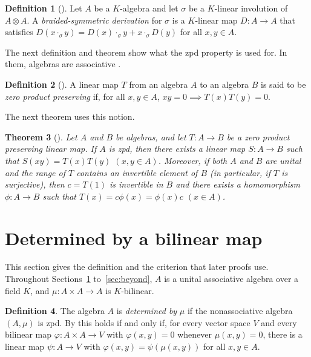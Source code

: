 \documentclass[]{interact}
\theoremstyle{plain}
\newtheorem{theorem}{Theorem}[section]
\theoremstyle{definition}
\newtheorem{definition}[theorem]{Definition}
\theoremstyle{remark}
\begin{document}
\begin{definition}[{\citep[Definition 3.1]{Adrabi2026}}]\label{def:adrabi-bsder}
Let $A$ be a $K$-algebra and let $\sigma$ be a $K$-linear involution of $A \otimes A$.
A \emph{braided-symmetric derivation} for $\sigma$ is a $K$-linear map $D \colon A \to A$ that satisfies $D(x \cdot_\sigma y) = D(x) \cdot_\sigma y + x \cdot_\sigma D(y)$ for all $x, y \in A$.
\end{definition}

The next definition and theorem show what the zpd property is used for. %
In them, algebras are associative \citep[\S7.1]{Bresar2021}.

\begin{definition}[{\citep[Definition 7.1]{Bresar2021}}]\label{def:bresar-zpp}
A linear map $T$ from an algebra $A$ to an algebra $B$ is said to be \emph{zero product preserving} if, for all $x, y \in A$, $xy = 0 \implies T(x)T(y) = 0$.
\end{definition}

The next theorem uses this notion. %

\begin{theorem}[{\citep[Theorem 7.2]{Bresar2021}}]\label{thm:bresar-zpp}
Let $A$ and $B$ be algebras, and let $T \colon A \to B$ be a zero product preserving linear map. If $A$ is zpd, then there exists a linear map $S \colon A \to B$ such that $S(xy) = T(x)T(y)$ $(x, y \in A)$.
Moreover, if both $A$ and $B$ are unital and the range of $T$ contains an invertible element of $B$ (in particular, if $T$ is surjective), then $c = T(1)$ is invertible in $B$ and there exists a homomorphism $\phi \colon A \to B$ such that $T(x) = c\phi(x) = \phi(x)c$ $(x \in A)$.
\end{theorem}

\section{Determined by a bilinear map}\label{sec:criterion}

This section gives the definition and the criterion that later proofs use.
Throughout Sections~\ref{sec:criterion} to~\ref{sec:beyond}, $A$ is a unital associative algebra over a field $K$, and $\mu \colon A \times A \to A$ is $K$-bilinear.

\begin{definition}\label{def:determined}
The algebra $A$ is \emph{determined by} $\mu$ if the nonassociative algebra $(A,\mu)$ is zpd.
By \citet[Proposition 1.3(iv)]{Bresar2021} this holds if and only if, for every vector space $V$ and every bilinear map $\varphi \colon A \times A \to V$ with $\varphi(x,y) = 0$ whenever $\mu(x,y) = 0$, there is a linear map $\psi \colon A \to V$ with $\varphi(x,y) = \psi(\mu(x,y))$ for all $x, y \in A$.
\end{definition}
\end{document}
